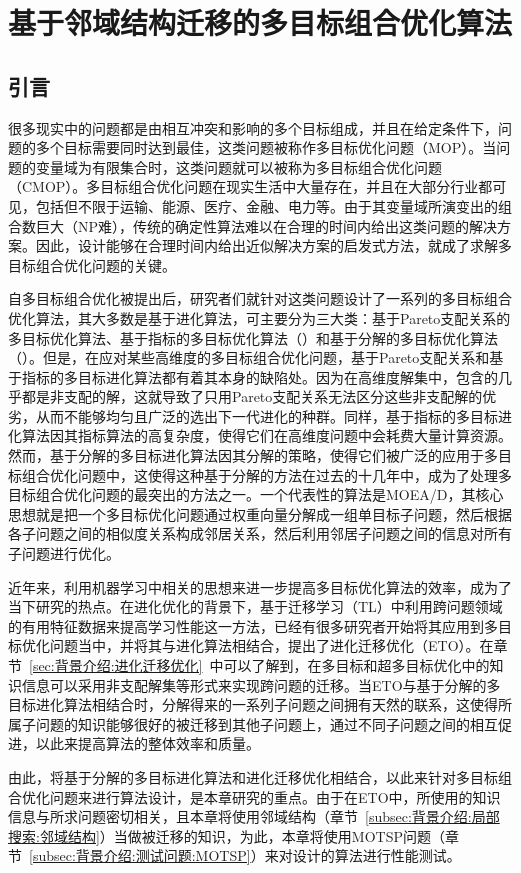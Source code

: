 \chapter{基于邻域结构迁移的多目标组合优化算法}
\label{chap:NST}

\section{引言}
\label{sec:NST:引言}
很多现实中的问题都是由相互冲突和影响的多个目标组成，并且在给定条件下，问题的多个目标需要同时达到最佳，这类问题被称作多目标优化问题（MOP）。当问题的变量域为有限集合时，这类问题就可以被称为多目标组合优化问题（CMOP）。多目标组合优化问题在现实生活中大量存在，并且在大部分行业都可见，包括但不限于运输、能源、医疗、金融、电力等。由于其变量域所演变出的组合数巨大（NP难），传统的确定性算法难以在合理的时间内给出这类问题的解决方案。因此，设计能够在合理时间内给出近似解决方案的启发式方法，就成了求解多目标组合优化问题的关键。
\par
自多目标组合优化被提出后，研究者们就针对这类问题设计了一系列的多目标组合优化算法，其大多数是基于进化算法，可主要分为三大类：基于Pareto支配关系的多目标优化算法\cite{deb2002fast}、基于指标的多目标优化算法（）和基于分解的多目标优化算法（）。但是，在应对某些高维度的多目标组合优化问题，基于Pareto支配关系和基于指标的多目标进化算法都有着其本身的缺陷处。因为在高维度解集中，包含的几乎都是非支配的解，这就导致了只用Pareto支配关系无法区分这些非支配解的优劣，从而不能够均匀且广泛的选出下一代进化的种群。同样，基于指标的多目标进化算法因其指标算法的高复杂度，使得它们在高维度问题中会耗费大量计算资源。然而，基于分解的多目标进化算法因其分解的策略，使得它们被广泛的应用于多目标组合优化问题中，这使得这种基于分解的方法在过去的十几年中，成为了处理多目标组合优化问题的最突出的方法之一。一个代表性的算法是MOEA/D\cite{zhang2007moea}，其核心思想就是把一个多目标优化问题通过权重向量分解成一组单目标子问题，然后根据各子问题之间的相似度关系构成邻居关系，然后利用邻居子问题之间的信息对所有子问题进行优化。
\par
近年来，利用机器学习中相关的思想来进一步提高多目标优化算法的效率，成为了当下研究的热点。在进化优化的背景下，基于迁移学习（TL）中利用跨问题领域的有用特征数据来提高学习性能这一方法，已经有很多研究者开始将其应用到多目标优化问题当中，并将其与进化算法相结合，提出了进化迁移优化（ETO）\cite{feng2020explicit,lin2020effective,tan2021evolutionary}。在章节~\ref{sec:背景介绍:进化迁移优化}~中可以了解到，在多目标和超多目标优化中的知识信息可以采用非支配解集等形式来实现跨问题的迁移。当ETO与基于分解的多目标进化算法相结合时，分解得来的一系列子问题之间拥有天然的联系，这使得所属子问题的知识能够很好的被迁移到其他子问题上，通过不同子问题之间的相互促进，以此来提高算法的整体效率和质量。
\par
由此，将基于分解的多目标进化算法和进化迁移优化相结合，以此来针对多目标组合优化问题来进行算法设计，是本章研究的重点。由于在ETO中，所使用的知识信息与所求问题密切相关，且本章将使用邻域结构（章节~\ref{subsec:背景介绍:局部搜索:邻域结构}）当做被迁移的知识，为此，本章将使用MOTSP问题（章节~\ref{subsec:背景介绍:测试问题:MOTSP}）来对设计的算法进行性能测试。

